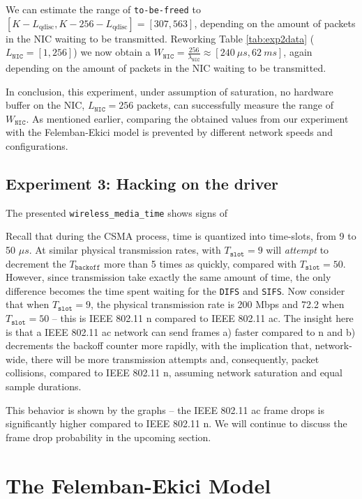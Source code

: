 We can estimate the range of \texttt{to-be-freed} to $[K - L_\text{qdisc}, K -
256 - L_\text{qdisc}] = [307, 563]$, depending on the amount of packets in the
NIC waiting to be transmitted. Reworking Table \ref{tab:exp2data}
($L_\texttt{NIC} = [1, 256]$) we now obtain a $W_\texttt{NIC} =
\frac{256}{\lambda_\texttt{NIC}} \approx [240~\mu s, 62~ms]$, again depending
on the amount of packets in the NIC waiting to be transmitted.

In conclusion, this experiment, under assumption of saturation, no hardware
buffer on the NIC, $L_\texttt{NIC} = 256$ packets, can successfully measure
the range of $W_\texttt{NIC}$. As mentioned earlier, comparing the obtained
values from our experiment with the Felemban-Ekici model is prevented by
different network speeds and configurations.

\subsection{Experiment 3: Hacking on the driver}

The presented \texttt{wireless\_media\_time} shows signs of


Recall that during the CSMA process, time is quantized into time-slots, from 9
to 50 $\mu s$. At similar physical transmission rates, with $T_{\texttt{slot}}
= 9$ will \emph{attempt} to decrement the $T_{\texttt{backoff}}$ more than 5
times as quickly, compared with $T_\texttt{slot} = 50$. However, since
transmission take exactly the same amount of time, the only difference becomes
the time spent waiting for the \texttt{DIFS} and \texttt{SIFS}. Now consider
that when $T_{\texttt{slot}} = 9$, the physical transmission rate is 200 Mbps
and 72.2 when $T_{\texttt{slot}} = 50$ -- this is IEEE 802.11 n compared to
IEEE 802.11 ac. The insight here is that a IEEE 802.11 ac network can send
frames a) faster compared to n and b) decrements the backoff counter more
rapidly, with the implication that, network-wide, there will be more
transmission attempts and, consequently, packet collisions, compared to
IEEE 802.11 n, assuming network saturation and equal sample durations.

This behavior is shown by the graphs -- the IEEE 802.11 ac frame drops is
significantly higher compared to IEEE 802.11 n. We will continue to discuss
the frame drop probability in the upcoming section.

\section{The Felemban-Ekici Model}

